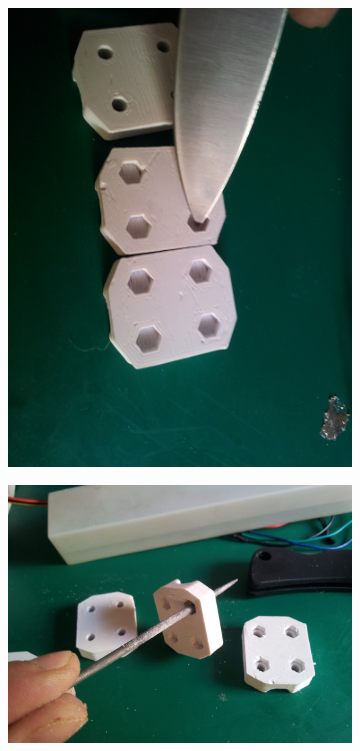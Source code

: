 		\begin{figure}[H]
		        \centering
		        \begin{subfigure}[htb]{0.5\textwidth}
		                \centering
		                \includegraphics[width=\textwidth]{../../Fotos/87.jpg}
		                \label{fig:19.z}
		        \end{subfigure}
		        \begin{subfigure}[htb]{0.5\textwidth}
		                \centering
		                \includegraphics[width=\textwidth]{../../Fotos/88.jpg}

\end{subfigure}
\end{figure}
